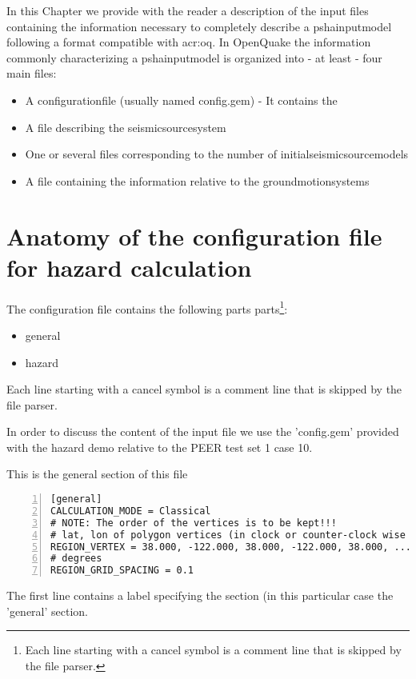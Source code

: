 In this Chapter we provide with the reader a description of the input 
files containing the information necessary to completely describe a 
\gls{pshainputmodel} following a format compatible with \gls{acr:oq}. 
%
In OpenQuake the information commonly characterizing a 
\gls{pshainputmodel} is organized into - at least - four main files:
%
\begin{itemize}
	\item A \gls{configurationfile} (usually named config.gem) - It contains the 	
	\item A file describing the \gls{seismicsourcesystem}
	\item One or several files corresponding to the number of 
		\glspl{initialseismicsourcemodel}
	\item A file containing the information relative to the 
		\glspl{groundmotionsystem}
\end{itemize}

%
\section{Anatomy of the configuration file for hazard calculation}
The configuration file contains the following parts
parts\footnote{
Each line starting with a cancel symbol is a comment line that is skipped
by the file parser.
}:
\begin{itemize}
	\item general 
	\item hazard
\end{itemize}
Each line starting with a cancel symbol is a comment line that is skipped
by the file parser. 

In order to discuss the content of the input file we use the 'config.gem' 
provided with the hazard demo relative to the PEER test set 1 case 10.

This is the general section of this file 
\begin{Verbatim}[baselinestretch=1,fontsize=\small,numbers=left,frame=single]
[general]
CALCULATION_MODE = Classical
# NOTE: The order of the vertices is to be kept!!!
# lat, lon of polygon vertices (in clock or counter-clock wise order)
REGION_VERTEX = 38.000, -122.000, 38.000, -122.000, 38.000, ...
# degrees
REGION_GRID_SPACING = 0.1
\end{Verbatim}
%
The first line contains a label specifying the section (in this 
particular case the 'general' section.

